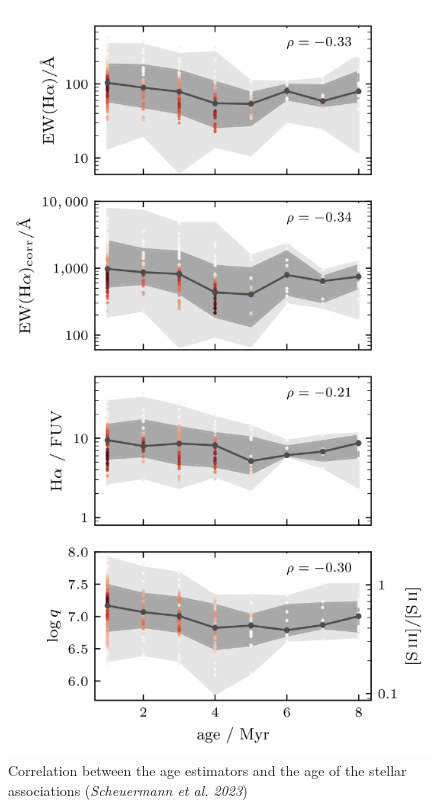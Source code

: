 \documentclass{beamer}
\begin{document}
\begin{frame}
    \begin{figure}[H]
        \centering
        \includegraphics[scale = 0.3]{image10.png}
        \caption{Correlation between the age estimators and the age of the stellar associations (\textit{Scheuermann et al. 2023})}
        \label{fig:image10}
    \end{figure}
    
\end{frame}
\end{document}
